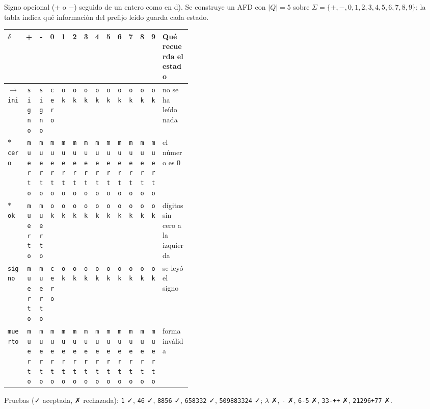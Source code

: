 \documentclass[11pt]{article}
\begin{document}
Signo opcional (+ o −) seguido de un entero como en d). Se construye un AFD con $|Q| = 5$ sobre $\Sigma = \{+, -, 0, 1, 2, 3, 4, 5, 6, 7, 8, 9\}$; la tabla indica qué información del prefijo leído guarda cada estado.
\begin{center}\small\begin{tabular}{lccccccccccccp{0.42\linewidth}}\toprule
$\delta$ & + & - & 0 & 1 & 2 & 3 & 4 & 5 & 6 & 7 & 8 & 9 & Qué recuerda el estado \\\midrule
$\to$ \texttt{ini} & \texttt{signo} & \texttt{signo} & \texttt{cero} & \texttt{ok} & \texttt{ok} & \texttt{ok} & \texttt{ok} & \texttt{ok} & \texttt{ok} & \texttt{ok} & \texttt{ok} & \texttt{ok} & no se ha leído nada \\
$*$ \texttt{cero} & \texttt{muerto} & \texttt{muerto} & \texttt{muerto} & \texttt{muerto} & \texttt{muerto} & \texttt{muerto} & \texttt{muerto} & \texttt{muerto} & \texttt{muerto} & \texttt{muerto} & \texttt{muerto} & \texttt{muerto} & el número es 0 \\
$*$ \texttt{ok} & \texttt{muerto} & \texttt{muerto} & \texttt{ok} & \texttt{ok} & \texttt{ok} & \texttt{ok} & \texttt{ok} & \texttt{ok} & \texttt{ok} & \texttt{ok} & \texttt{ok} & \texttt{ok} & dígitos sin cero a la izquierda \\
 \texttt{signo} & \texttt{muerto} & \texttt{muerto} & \texttt{cero} & \texttt{ok} & \texttt{ok} & \texttt{ok} & \texttt{ok} & \texttt{ok} & \texttt{ok} & \texttt{ok} & \texttt{ok} & \texttt{ok} & se leyó el signo \\
 \texttt{muerto} & \texttt{muerto} & \texttt{muerto} & \texttt{muerto} & \texttt{muerto} & \texttt{muerto} & \texttt{muerto} & \texttt{muerto} & \texttt{muerto} & \texttt{muerto} & \texttt{muerto} & \texttt{muerto} & \texttt{muerto} & forma inválida \\
\bottomrule\end{tabular}\end{center}
Pruebas (✓ aceptada, ✗ rechazada): \texttt{1} ✓, \texttt{46} ✓, \texttt{8856} ✓, \texttt{658332} ✓, \texttt{509883324} ✓; $\lambda$ ✗, \texttt{-} ✗, \texttt{6-5} ✗, \texttt{33-++} ✗, \texttt{21296+77} ✗.
\end{document}
